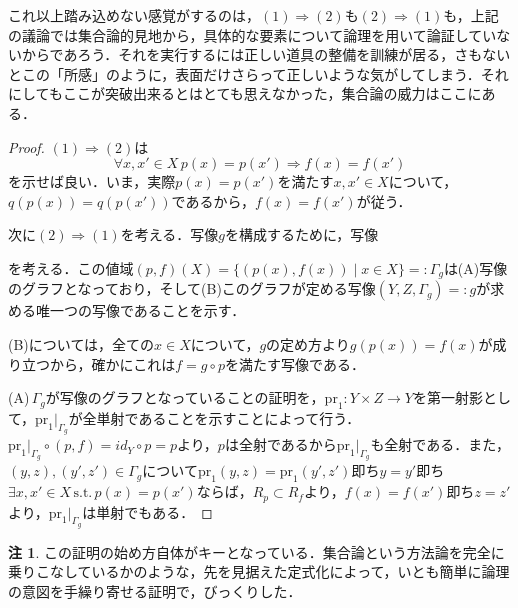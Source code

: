 \documentclass[uplatex, 12pt, dvipdfmx]{jsreport}
\theoremstyle{definition}
\newtheorem{remark}[theorem]{注}
\theoremstyle{StatementsWithStar}
\theoremstyle{StatementsWithStar2}
\theoremstyle{StatementsWithStar3}
\theoremstyle{StatementsWithCCirc}
\theoremstyle{definition}
\begin{document}
これ以上踏み込めない感覚がするのは，$(1)\Rightarrow (2)$も$(2)\Rightarrow (1)$も，上記の議論では集合論的見地から，具体的な要素について論理を用いて論証していないからであろう．それを実行するには正しい道具の整備を訓練が居る，さもないとこの「所感」のように，表面だけさらって正しいような気がしてしまう．それにしてもここが突破出来るとはとても思えなかった，集合論の威力はここにある．
\begin{proof}
    $(1)\Rightarrow (2)$は\[ \forall x,x'\in X \, p(x)=p(x')\Rightarrow f(x)=f(x') \]を示せば良い．いま，実際$p(x)=p(x')$を満たす$x,x'\in X$について，$q(p(x))=q(p(x'))$であるから，$f(x)=f(x')$が従う．

    次に$(2)\Rightarrow (1)$を考える．写像$g$を構成するために，写像
    \begin{center}\end{center}
    を考える．この値域$(p,f)(X)=\{ (p(x),f(x))\mid x\in X \}=:\Gamma_g$は(A)写像のグラフとなっており，そして(B)このグラフが定める写像$(Y,Z,\Gamma_g)=:g$が求める唯一つの写像であることを示す．

    (B)については，全ての$x\in X$について，$g$の定め方より$g(p(x))=f(x)$が成り立つから，確かにこれは$f=g\circ p$を満たす写像である．

    (A)\,$\Gamma_g$が写像のグラフとなっていることの証明を，$\mathrm{pr}_1:Y\times Z\to Y$を第一射影として，$\mathrm{pr}_1|_{\Gamma_g}$が全単射であることを示すことによって行う．
    $\mathrm{pr}_1|_{\Gamma_g}\circ (p,f)=id_Y\circ p=p$より，$p$は全射であるから$\mathrm{pr}_1|_{\Gamma_g}$も全射である．また，$(y,z),(y',z')\in\Gamma_g$について$\mathrm{pr}_1(y,z)=\mathrm{pr}_1(y',z')$即ち$y=y'$即ち
    $\exists x,x'\in X \,\mathrm{s.t.}\, p(x)=p(x')$ならば，$R_p\subset R_f$より，$f(x)=f(x')$即ち$z=z'$より，$\mathrm{pr}_1|_{\Gamma_g}$は単射でもある．
\end{proof}
\begin{remark}
    この証明の始め方自体がキーとなっている．集合論という方法論を完全に乗りこなしているかのような，先を見据えた定式化によって，いとも簡単に論理の意図を手繰り寄せる証明で，びっくりした．
\end{remark}
\end{document}
